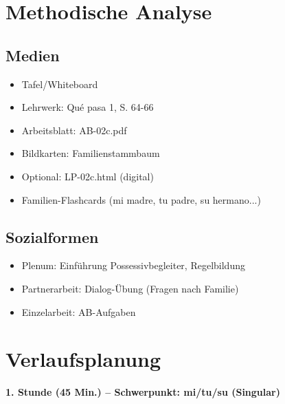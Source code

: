 \documentclass[11pt,a4paper]{article}
\newcommand{\lehrwerk}{Qué pasa 1}
\newcommand{\lehrwerkseite}{S. 64-66}
\begin{document}
\section{Methodische Analyse}

\subsection{Medien}
\begin{itemize}
    \item Tafel/Whiteboard
    \item Lehrwerk: \lehrwerk, \lehrwerkseite
    \item Arbeitsblatt: AB-02c.pdf
    \item Bildkarten: Familienstammbaum
    \item Optional: LP-02c.html (digital)
    \item Familien-Flashcards (mi madre, tu padre, su hermano...)
\end{itemize}

\subsection{Sozialformen}
\begin{itemize}
    \item Plenum: Einführung Possessivbegleiter, Regelbildung
    \item Partnerarbeit: Dialog-Übung (Fragen nach Familie)
    \item Einzelarbeit: AB-Aufgaben
\end{itemize}

\section{Verlaufsplanung}

\textbf{1. Stunde (45 Min.) -- Schwerpunkt: mi/tu/su (Singular)}
\end{document}

